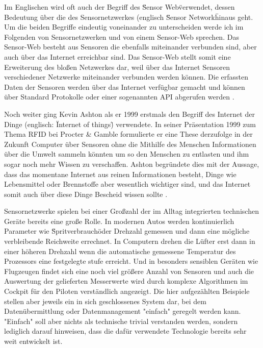 Im Englischen wird oft auch der Begriff des \"Sensor Web\" verwendet, dessen Bedeutung über die des Sensornetzwerkes (englisch \"Sensor Network\" hinaus geht. Um die beiden Begriffe eindeutig voneinander zu unterscheiden werde ich im Folgenden von Sensornetzwerken und von einem Sensor-Web sprechen. Das Sensor-Web besteht aus Sensoren die ebenfalls miteinander verbunden sind, aber auch über das Internet erreichbar sind. Das Sensor-Web stellt somit eine Erweiterung des bloßen Netzwerkes dar, weil über das Internet Sensoren verschiedener Netzwerke miteinander verbunden werden können. Die erfassten Daten der Sensoren werden über das Internet verfügbar gemacht und können über Standard Protokolle oder einer sogenannten  \gls{API} abgerufen werden \citep{botts_ogc_2008}.

Noch weiter ging Kevin Ashton als er 1999 erstmals den Begriff des Internet der Dinge (englisch: \"Internet of things\") verwendete. In seiner Präsentation 1999 zum Thema  \gls{RFID} bei Procter \& Gamble formulierte er eine These derzufolge in der Zukunft Computer über Sensoren ohne die Mithilfe des Menschen Informationen über die Umwelt sammeln könnten um so den Menschen zu entlasten und ihm sogar noch mehr Wissen zu verschaffen. Ashton begründete dies mit der Aussage, dass das momentane Internet aus reinen Informationen besteht, Dinge wie Lebensmittel oder Brennstoffe aber wesentlich wichtiger sind, und das Internet somit auch über diese Dinge Bescheid wissen sollte \citep{ashton_that_2009}.

Sensornetzwerke spielen bei einer Großzahl der im Alltag integrierten technischen Geräte bereits eine große Rolle. In modernen Autos werden kontinuierlich Parameter wie \"Spritverbrauch\" oder Drehzahl gemessen und dann eine mögliche verbleibende Reichweite errechnet. In Computern drehen die Lüfter erst dann in einer höheren Drehzahl wenn die automatische gemessene Temperatur des Prozessors eine festgelegte stufe erreicht. Und in besonders sensiblen Geräten wie Flugzeugen findet sich eine noch viel größere Anzahl von Sensoren und auch die Auswertung der gelieferten Messerwerte wird durch komplexe Algorithmen im Cockpit für den Piloten verständlich angezeigt. Die hier aufgezählten Beispiele stellen aber jeweils ein in sich geschlossenes System dar, bei dem Datenübermittlung oder Datenmanagement "einfach" geregelt werden kann. "Einfach" soll aber nichts als technische trivial verstanden werden, sondern lediglich darauf hinweisen, dass die dafür verwendete Technologie bereits sehr weit entwickelt ist. 

